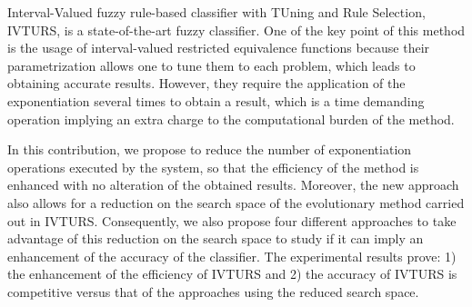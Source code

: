

Interval-Valued fuzzy rule-based classifier with TUning and Rule Selection, IVTURS, is a state-of-the-art fuzzy classifier.  One of the key point of this method is the usage of interval-valued restricted equivalence functions because their parametrization allows one to tune them to each problem, which leads to obtaining accurate results. However, they require the application of the exponentiation several times to obtain a result, which is a time demanding operation implying an extra charge to the computational burden of the method. 

In this contribution, we propose to reduce the number of exponentiation operations executed by the system, so that the efficiency of the method is enhanced with no alteration of the obtained results. Moreover, the new approach also allows for a reduction on the search space of the evolutionary method carried out in IVTURS. Consequently, we also propose four different approaches to take advantage of this reduction on the search space to study if it can imply an enhancement of the accuracy of the classifier. The experimental results prove: 1) the enhancement of the efficiency of IVTURS and 2) the accuracy of IVTURS is competitive versus that of the approaches using the reduced search space.




